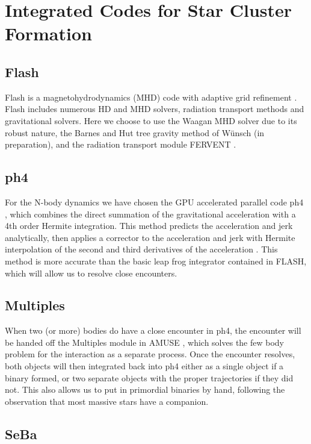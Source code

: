 \documentclass[11pt]{article}
\begin{document}
\section{Integrated Codes for Star Cluster Formation}


\subsection{Flash}

Flash is a magnetohydrodynamics (MHD) code with adaptive grid refinement \citep{FLASH}. Flash includes numerous HD and MHD solvers, radiation transport methods and gravitational solvers. Here we choose to use the Waagan MHD solver \citep{Waagan2011} due to its robust nature, the Barnes and Hut tree gravity method of W\"{u}nsch (in preparation), and the radiation transport module FERVENT \citep{BaczynskiGloverKlessen2015}.

\subsection{ph4}

For the N-body dynamics we have chosen the GPU accelerated parallel code ph4 \citep{ph4}, which combines the direct summation of the gravitational acceleration with a 4th order Hermite integration. This method predicts the acceleration and jerk analytically, then applies a corrector to the acceleration and jerk with Hermite interpolation of the second and third derivatives of the acceleration \citep{Makino4thHermite}. This method is more accurate than the basic leap frog integrator contained in FLASH, which will allow us to resolve close encounters.

\subsection{Multiples}

When two (or more) bodies do have a close encounter in ph4, the encounter will be handed off the Multiples module in AMUSE \citep{AMUSE}, which solves the few body problem for the interaction as a separate process. Once the encounter resolves, both objects will then integrated back into ph4 either as a single object if a binary formed, or two separate objects with the proper trajectories if they did not. This also allows us to put in primordial binaries by hand, following the observation that most massive stars have a companion.

\subsection{SeBa}
\end{document}
